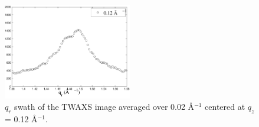 \begin{figure}
  \centering
  \includegraphics[width=0.5\textwidth]{figures/ripple/TWAXS/twaxs_qrplot8}
  \caption{$q_r$ swath of the TWAXS image averaged over 0.02 \AA$^{-1}$
  centered at $q_z$ = 0.12 \AA$^{-1}$.}
  \label{fig:twaxs_weak_peak}
\end{figure}

